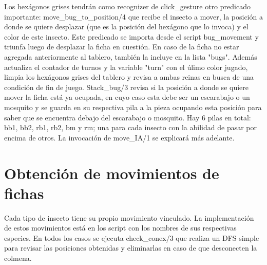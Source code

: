 \documentclass[a4paper,12pt]{article}
\begin{document}
Los hexágonos grises tendrán como recognizer de click\_gesture otro predicado importante: move\_bug\_to\_position/4 que recibe el insecto a mover, la posición a donde se quiere desplazar (que es la posición del hexágono que lo invoca) y el color de este insecto. Este predicado se importa desde el script bug\_movement y triunfa luego de desplazar la ficha en cuestión. En caso de la ficha no estar agregada anteriormente al tablero, también la incluye en la lista "bugs". Además actualiza el contador de turnos y la variable "turn" con el úlimo color jugado, limpia los hexágonos grises del tablero y revisa a ambas reinas en busca de una condición de fin de juego. Stack\_bug/3 revisa si la posición a donde se quiere mover la ficha está ya ocupada, en cuyo caso esta debe ser un escarabajo o un mosquito y se guarda en su respectiva pila a la pieza ocupando esta posición para saber que se encuentra debajo del escarabajo o mosquito. Hay 6 pilas en total: bb1, bb2, rb1, rb2, bm y rm; una para cada insecto con la abilidad de pasar por encima de otros. La invocación de move\_IA/1 se explicará más adelante.


\section*{Obtención de movimientos de fichas}
Cada tipo de insecto tiene su propio movimiento vinculado. La implementación de estos movimientos está en los script con los nombres de sus respectivas especies. En todos los casos se ejecuta check\_conex/3 que realiza un DFS simple para revisar las posiciones obtenidas y eliminarlas en caso de que desconecten la colmena.
\end{document}
